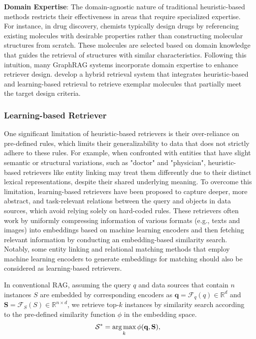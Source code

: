 \textbf{Domain Expertise}:
The domain-agnostic nature of traditional heuristic-based methods restricts their effectiveness in areas that require specialized expertise. For instance, in drug discovery, chemists typically design drugs by referencing existing molecules with desirable properties rather than constructing molecular structures from scratch. These molecules are selected based on domain knowledge that guides the retrieval of structures with similar characteristics. Following this intuition, many GraphRAG systems incorporate domain expertise to enhance retriever design. \citet{wang2022retrieval} develop a hybrid retrieval system that integrates heuristic-based and learning-based retrieval to retrieve exemplar molecules that partially meet the target design criteria.


\subsubsection{Learning-based Retriever}
One significant limitation of heuristic-based retrievers is their over-reliance on pre-defined rules, which limits their generalizability to data that does not strictly adhere to these rules. For example, when confronted with entities that have slight semantic or structural variations, such as "doctor" and "physician", heuristic-based retrievers like entity linking may treat them differently due to their distinct lexical representations, despite their shared underlying meaning. To overcome this limitation, learning-based retrievers have been proposed to capture deeper, more abstract, and task-relevant relations between the query and objects in data sources, which avoid relying solely on hard-coded rules. These retrievers often work by uniformly compressing information of various formats (e.g., texts and images) into embeddings based on machine learning encoders and then fetching relevant information by conducting an embedding-based similarity search. Notably, some entity linking and relational matching methods that employ machine learning encoders to generate embeddings for matching should also be considered as learning-based retrievers. 

In conventional RAG, assuming the query $q$ and data sources that contain $n$ instances $S$ are embedded by corresponding encoders as $\mathbf{q} = \mathcal{F}_{q}(q) \in \mathbb{R}^{d}$ and $\mathbf{S} = \mathcal{F}_{S}(S) \in \mathbb{R}^{n\times d}$, we retrieve top-$k$ instances by similarity search according to the pre-defined similarity function $\phi$ in the embedding space. 
\begin{equation}
    \mathcal{S}^{*} = \operatorname*{arg\,max}_{k}\phi(\mathbf{q}, \mathbf{S}),
\end{equation}

